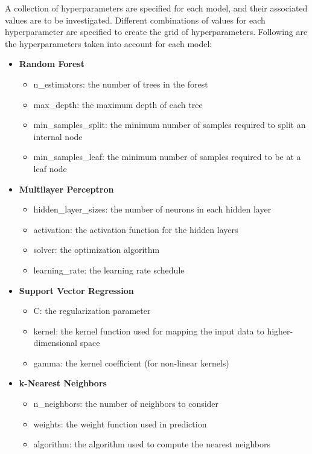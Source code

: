 \documentclass[a4paper,11pt]{report}%
\renewcommand{\\}{\vspace*{0.5\baselineskip} \newline}
\begin{document}
\noindent A collection of hyperparameters are specified for each model, and their associated values are to be investigated. Different combinations of values for each hyperparameter are specified to create the grid of hyperparameters. Following are the hyperparameters taken into account for each model:
\begin{itemize}
    \item \textbf{Random Forest}
    \begin{itemize}
        \item n\_estimators: the number of trees in the forest
        \item max\_depth: the maximum depth of each tree
        \item min\_samples\_split: the minimum number of samples required to split an internal node 
        \item min\_samples\_leaf: the minimum number of samples required to be at a leaf node
    \end{itemize}
\end{itemize}
\begin{itemize}
    \item \textbf{Multilayer Perceptron}
    \begin{itemize}
        \item hidden\_layer\_sizes: the number of neurons in each hidden layer
        \item activation: the activation function for the hidden layers
        \item solver: the optimization algorithm 
        \item learning\_rate: the learning rate schedule
    \end{itemize}
\end{itemize}
\begin{itemize}
    \item \textbf{Support Vector Regression}
    \begin{itemize}
        \item C: the regularization parameter
        \item kernel: the kernel function used for mapping the input data to higher-dimensional space
        \item gamma: the kernel coefficient (for non-linear kernels)
    \end{itemize}
\end{itemize}
\begin{itemize}
    \item \textbf{k-Nearest Neighbors}
    \begin{itemize}
        \item n\_neighbors: the number of neighbors to consider
        \item weights: the weight function used in prediction
        \item algorithm: the algorithm used to compute the nearest neighbors
    \end{itemize}
\end{itemize}
\end{document}
